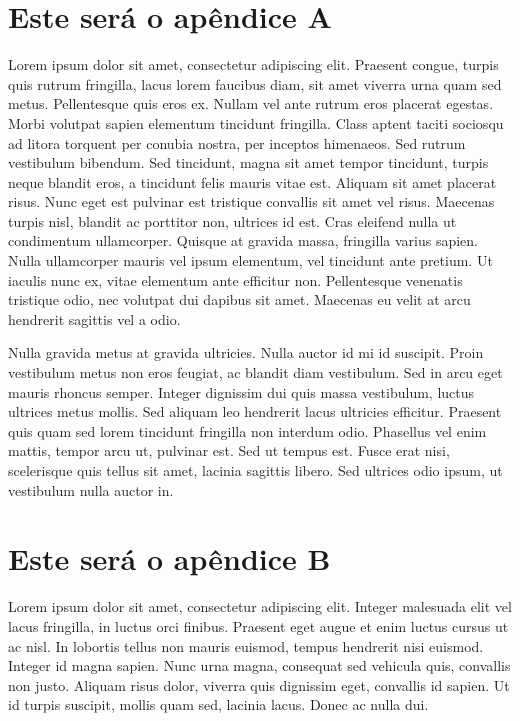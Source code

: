 
\begin{apendicesenv}

\partapendices

\chapter{Este será o apêndice A}
Lorem ipsum dolor sit amet, consectetur adipiscing elit. Praesent congue, turpis quis rutrum fringilla, lacus lorem faucibus diam, sit amet viverra urna quam sed metus. Pellentesque quis eros ex. Nullam vel ante rutrum eros placerat egestas. Morbi volutpat sapien elementum tincidunt fringilla. Class aptent taciti sociosqu ad litora torquent per conubia nostra, per inceptos himenaeos. Sed rutrum vestibulum bibendum. Sed tincidunt, magna sit amet tempor tincidunt, turpis neque blandit eros, a tincidunt felis mauris vitae est. Aliquam sit amet placerat risus. Nunc eget est pulvinar est tristique convallis sit amet vel risus. Maecenas turpis nisl, blandit ac porttitor non, ultrices id est. Cras eleifend nulla ut condimentum ullamcorper. Quisque at gravida massa, fringilla varius sapien. Nulla ullamcorper mauris vel ipsum elementum, vel tincidunt ante pretium. Ut iaculis nunc ex, vitae elementum ante efficitur non. Pellentesque venenatis tristique odio, nec volutpat dui dapibus sit amet. Maecenas eu velit at arcu hendrerit sagittis vel a odio.

Nulla gravida metus at gravida ultricies. Nulla auctor id mi id suscipit. Proin vestibulum metus non eros feugiat, ac blandit diam vestibulum. Sed in arcu eget mauris rhoncus semper. Integer dignissim dui quis massa vestibulum, luctus ultrices metus mollis. Sed aliquam leo hendrerit lacus ultricies efficitur. Praesent quis quam sed lorem tincidunt fringilla non interdum odio. Phasellus vel enim mattis, tempor arcu ut, pulvinar est. Sed ut tempus est. Fusce erat nisi, scelerisque quis tellus sit amet, lacinia sagittis libero. Sed ultrices odio ipsum, ut vestibulum nulla auctor in.





\chapter{Este será o apêndice B}
Lorem ipsum dolor sit amet, consectetur adipiscing elit. Integer malesuada elit vel lacus fringilla, in luctus orci finibus. Praesent eget augue et enim luctus cursus ut ac nisl. In lobortis tellus non mauris euismod, tempus hendrerit nisi euismod. Integer id magna sapien. Nunc urna magna, consequat sed vehicula quis, convallis non justo. Aliquam risus dolor, viverra quis dignissim eget, convallis id sapien. Ut id turpis suscipit, mollis quam sed, lacinia lacus. Donec ac nulla dui.


\end{apendicesenv}